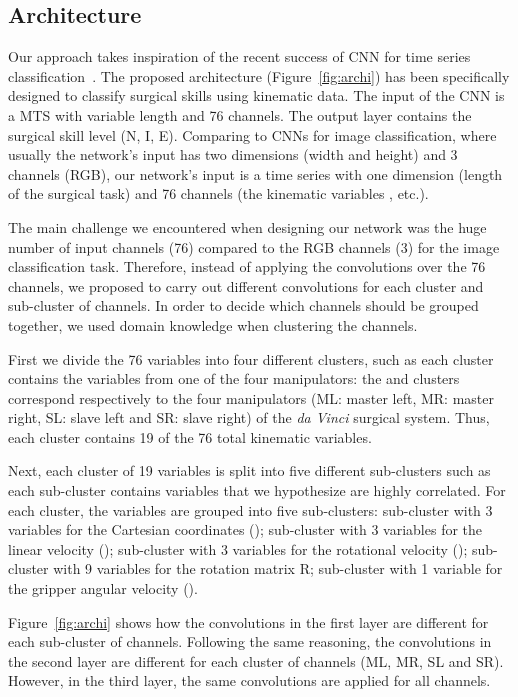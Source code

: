 \documentclass{llncs}
\begin{document}
\subsection{Architecture}
Our approach takes inspiration of the recent success of CNN for time series classification~\cite{wang2017time}. 
The proposed architecture (Figure~\ref{fig:archi}) has been specifically designed to classify surgical skills using kinematic data. 
The input of the CNN is a MTS with variable length  and 76 channels.
The output layer contains the surgical skill level (N, I, E).
Comparing to CNNs for image classification, where usually the network's input has two dimensions (width and height) and 3 channels (RGB), our network's input is a time series with one dimension (length  of the surgical task) and 76 channels (the kinematic variables , etc.).

The main challenge we encountered when designing our network was the huge number of input channels (76) compared to the RGB channels (3) for the image classification task. 
Therefore, instead of applying the convolutions over the 76 channels, we proposed to carry out different convolutions for each cluster and sub-cluster of channels.
In order to decide which channels should be grouped together, we used domain knowledge when clustering the channels.

First we divide the 76 variables into four different clusters, such as each cluster contains the variables from one of the four manipulators: the  and  clusters correspond respectively to the four manipulators (ML: master left, MR: master right, SL: slave left and SR: slave right) of the \emph{da Vinci} surgical system. 
Thus, each cluster contains 19 of the 76 total kinematic variables.  

Next, each cluster of 19 variables is split into five different sub-clusters such as each sub-cluster contains variables that we hypothesize are highly correlated.
For each cluster, the variables are grouped into five sub-clusters: 
 sub-cluster with 3 variables for the Cartesian coordinates ();
 sub-cluster with 3 variables for the linear velocity ();
 sub-cluster with 3 variables for the rotational velocity ();
 sub-cluster with 9 variables for the rotation matrix R;
 sub-cluster with 1 variable for the gripper angular velocity ().  

Figure~\ref{fig:archi} shows how the convolutions in the first layer are different for each sub-cluster of channels. 
Following the same reasoning, the convolutions in the second layer are different for each cluster of channels (ML, MR, SL and SR). 
However, in the third layer, the same convolutions are applied for all channels. 
\end{document}
